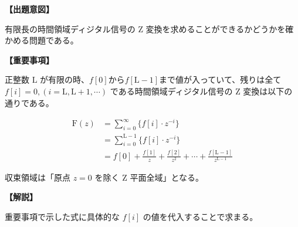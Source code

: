 \noindent \textbf{【出題意図】}

\bigskip
\noindent 有限長の時間領域ディジタル信号の Z 変換を求めることができるかどうかを確かめる問題である。

\vspace{1em}
\noindent \textbf{【重要事項】}

\medskip
正整数 $\textrm{L}$ が有限の時、$f[0]$から$f[\textrm{L}-1]$まで値が入っていて、残りは全て $f[i]=0, (i=\textrm{L},\textrm{L}+1,\cdots)$ である時間領域ディジタル信号の Z 変換は以下の通りである。

\begin{align*}
\textrm{F}(z) 
& = \sum_{i=0}^\infty \{ f[i] \cdot z^{-i} \} \\
& = \sum_{i=0}^{\textrm{L}-1} \{ f[i] \cdot z^{-i} \} \\
& = f[0] + \frac{f[1]}{z} + \frac{f[2]}{z^2} + \cdots + \frac{f[\textrm{L}-1]}{z^{\textrm{L}-1}}
\end{align*}

\medskip
\noindent 収束領域は「原点 $z=0$ を除く Z 平面全域」となる。

\bigskip

\vspace{1em}
\noindent \textbf{【解説】}

\bigskip
\noindent 重要事項で示した式に具体的な $f[i]$ の値を代入することで求まる。

